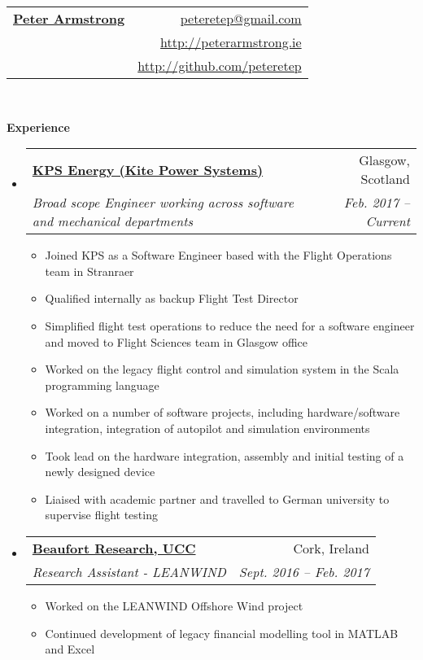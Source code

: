 \documentclass[letterpaper,11pt]{article}
\makeatletter
\newcommand{\resitem}[1]{\item #1 \vspace{-2pt}}
\newcommand{\resheading}[1]{{\large \colorbox{mygrey}{\begin{minipage}{\textwidth}{\textbf{#1 \vphantom{p\^{E}}}}\end{minipage}}}}
\newcommand{\ressubheading}[4]{
\begin{tabular*}{6.5in}{l@{\extracolsep{\fill}}r}
		\textbf{#1} & #2 \\
		\textit{#3} & \textit{#4} \\
\end{tabular*}\vspace{-6pt}}
\makeatother
\begin{document}
\newcommand{\mywebheader}{
\begin{tabular*}{7in}{l@{\extracolsep{\fill}}r}
	\textbf{\href{http://peterarmstrong.ie/}{\LARGE Peter Armstrong}} & \href{mailto:peteretep@gmail.com}{peteretep@gmail.com}\\
	& \href{http://peterarmstrong.ie}{http://peterarmstrong.ie} \\
	& \href{http://github.com/peteretep}{http://github.com/peteretep}
	\end{tabular*}
\\
\vspace{0.1in}}

\mywebheader

\resheading{Experience}
  
	\begin{itemize}
    \item 
      \ressubheading{\href{http://www.kps.energy}{KPS Energy (Kite Power Systems)}}{Glasgow, Scotland}
        {Broad scope Engineer working across software and mechanical departments }{Feb. 2017 -- Current}
        {
        \begin{itemize}
          \resitem{Joined KPS as a Software Engineer based with the Flight Operations team in Stranraer}
          \resitem{Qualified internally as backup Flight Test Director }
          \resitem{Simplified flight test operations to reduce the need for a software engineer and moved to Flight Sciences team in Glasgow office}
          \resitem{Worked on the legacy flight control and simulation system in the Scala programming language}
          \resitem{Worked on a number of software projects, including hardware/software integration, integration of autopilot and simulation environments}
          \resitem{Took lead on the hardware integration, assembly and initial testing of a newly designed device}
          \resitem{Liaised with academic partner and travelled to German university to supervise flight testing}
          
        \end{itemize}
        }

    \item 
      \ressubheading{\href{http://www.ucc.ie}{Beaufort Research, UCC}}{Cork, Ireland}
        {Research Assistant - LEANWIND}{Sept. 2016 -- Feb. 2017  }
        {
        \begin{itemize}
          \resitem{Worked on the LEANWIND Offshore Wind project}
          \resitem{Continued development of legacy financial modelling tool in MATLAB and Excel}
        \end{itemize}
        }


\end{itemize}
\end{document}
